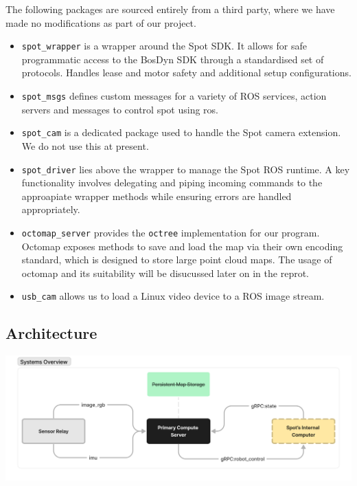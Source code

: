 \documentclass[10pt,english]{article}
\begin{document}
The following packages are sourced entirely from a third party, where we have made no modifications as part of our project.

\begin{itemize}[noitemsep]
    \item \texttt{spot\_wrapper} is a wrapper around the Spot SDK. It allows for safe programmatic access to the BosDyn SDK through a standardised set of protocols. Handles lease and motor safety and additional setup configurations.
    \item \texttt{spot\_msgs} defines custom messages for a variety of ROS services, action servers and messages to control spot using ros.
    \item \texttt{spot\_cam} is a dedicated package used to handle the Spot camera extension. We do not use this at present.
    \item \texttt{spot\_driver} lies above the wrapper to manage the Spot ROS runtime. A key functionality involves delegating and piping incoming commands to the approapiate wrapper methods while ensuring errors are handled appropriately.
    \item \texttt{octomap\_server} provides the \texttt{octree} implementation for our program. Octomap exposes methods to save and load the map via their own encoding standard, which is designed to store large point cloud maps. The usage of octomap and its suitability will be disucussed later on in the reprot.
    \item \texttt{usb\_cam} allows us to load a Linux video device to a ROS image stream.
\end{itemize}

\clearpage

\subsection*{Architecture}





\vspace*{\fill}
\begin{center}
    \includegraphics[width=\textwidth]{images/Systems Overview.png}
\end{center}
\end{document}
